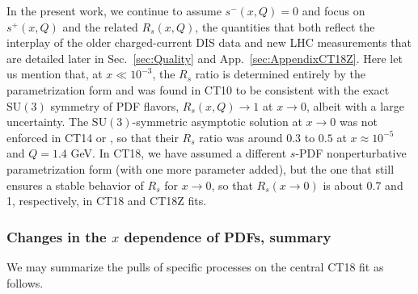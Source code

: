 In the present work, we continue to assume $s^-(x,Q)=0$ and focus on $s^+(x,Q)$
and the related $R_s(x,Q)$, the quantities that
both reflect the interplay of the older charged-current DIS data and new LHC measurements that are detailed later in Sec.~\ref{sec:Quality} and App.~\ref{sec:AppendixCT18Z}.
Here let us mention that, at $ x  \ll 10 ^{-3}$, the $R_s$
ratio is determined entirely by the parametrization form and was found
in CT10 to be consistent with the exact $\mathrm{SU}(3)$ symmetry of PDF
flavors, $R_s(x,Q) \rightarrow 1$
at $x\rightarrow 0$, albeit with a large uncertainty. 
The $\mathrm{SU}(3)$-symmetric asymptotic solution at $x\rightarrow 0$
was not enforced in CT14 or \CTHERAII, so that their $R_s$ ratio  
was around $0.3$ to $0.5$ at $x\approx 10^{-5}$ and $Q=1.4$ GeV.
In CT18, we have assumed a different $s$-PDF nonperturbative
parametrization form (with one more parameter added), but the one that
still ensures a stable behavior of $R_s$ for $x\! \to\! 0$, so that
$R_s (x \to 0)$ is about 0.7 and 1, respectively, in CT18 and CT18Z
fits. 

\subsubsection{Changes in the $x$ dependence of PDFs, summary}
We may summarize the pulls of specific processes on the central CT18 fit as follows. 

